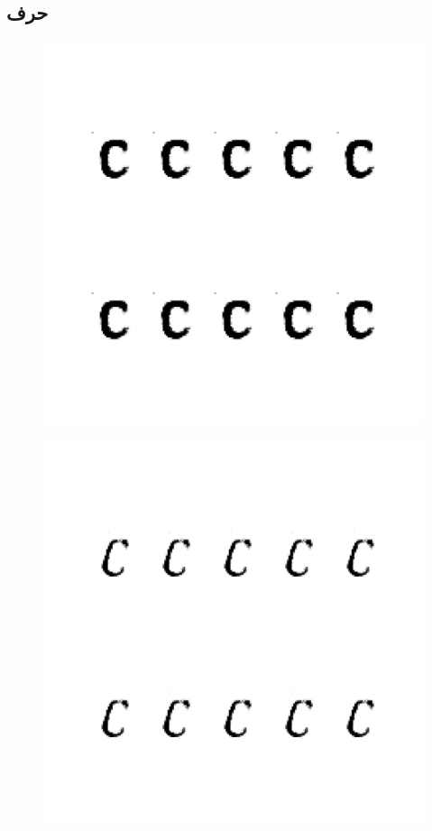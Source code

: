 \documentclass{article}
\begin{document}
\subsection{حرف }
\begin{figure}[H]
	\centerline{\includegraphics[width=\textwidth , height=\textheight ]{../results/CGAN_Adam/figs/letters/C/95.pdf}}
\end{figure}
\begin{figure}[H]
	\centerline{\includegraphics[width=\textwidth , height=\textheight ]{../results/CGAN_Adam/figs/letters/C/90.pdf}}
\end{figure}
\end{document}
